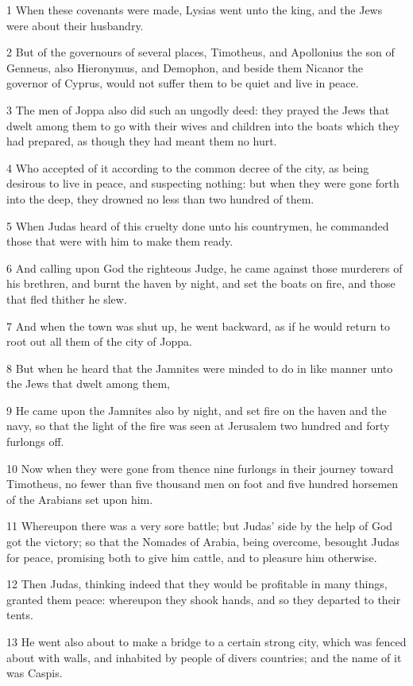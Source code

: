 \par 1 When these covenants were made, Lysias went unto the king, and the Jews were about their husbandry.
\par 2 But of the governours of several places, Timotheus, and Apollonius the son of Genneus, also Hieronymus, and Demophon, and beside them Nicanor the governor of Cyprus, would not suffer them to be quiet and live in peace.
\par 3 The men of Joppa also did such an ungodly deed: they prayed the Jews that dwelt among them to go with their wives and children into the boats which they had prepared, as though they had meant them no hurt.
\par 4 Who accepted of it according to the common decree of the city, as being desirous to live in peace, and suspecting nothing: but when they were gone forth into the deep, they drowned no less than two hundred of them.
\par 5 When Judas heard of this cruelty done unto his countrymen, he commanded those that were with him to make them ready.
\par 6 And calling upon God the righteous Judge, he came against those murderers of his brethren, and burnt the haven by night, and set the boats on fire, and those that fled thither he slew.
\par 7 And when the town was shut up, he went backward, as if he would return to root out all them of the city of Joppa.
\par 8 But when he heard that the Jamnites were minded to do in like manner unto the Jews that dwelt among them,
\par 9 He came upon the Jamnites also by night, and set fire on the haven and the navy, so that the light of the fire was seen at Jerusalem two hundred and forty furlongs off.
\par 10 Now when they were gone from thence nine furlongs in their journey toward Timotheus, no fewer than five thousand men on foot and five hundred horsemen of the Arabians set upon him.
\par 11 Whereupon there was a very sore battle; but Judas' side by the help of God got the victory; so that the Nomades of Arabia, being overcome, besought Judas for peace, promising both to give him cattle, and to pleasure him otherwise.
\par 12 Then Judas, thinking indeed that they would be profitable in many things, granted them peace: whereupon they shook hands, and so they departed to their tents.
\par 13 He went also about to make a bridge to a certain strong city, which was fenced about with walls, and inhabited by people of divers countries; and the name of it was Caspis.
